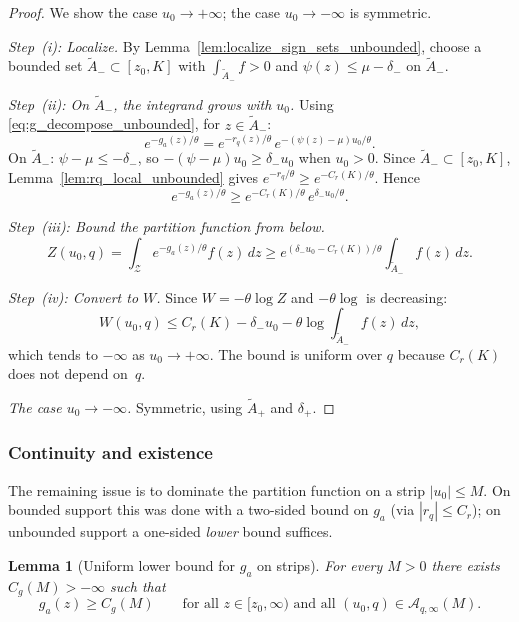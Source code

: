 \documentclass[12pt,a4paper]{article}
\theoremstyle{definition}
\theoremstyle{plain}
\newtheorem{lemma}{Lemma}[section]
\theoremstyle{remark}
\newcommand{\zlow}{z_{\scriptscriptstyle 0}}
\newcommand{\calZ}{\mathcal{Z}}
\begin{document}
\begin{proof}
We show the case $u_0 \to +\infty$; the case
$u_0 \to -\infty$ is symmetric.

\emph{Step~(i): Localize.}
By Lemma~\ref{lem:localize_sign_sets_unbounded}, choose a
bounded set $\widetilde A_- \subset [\zlow,K]$ with
$\int_{\widetilde A_-} f > 0$ and
$\psi(z) \leq \mu - \delta_-$ on $\widetilde A_-$.

\emph{Step~(ii): On $\widetilde A_-$, the integrand grows
with $u_0$.}
Using \eqref{eq:g_decompose_unbounded}, for
$z \in \widetilde A_-$:
\[
  e^{-g_a(z)/\theta}
  = e^{-r_q(z)/\theta}\,
    e^{-(\psi(z)-\mu)u_0/\theta}.
\]
On $\widetilde A_-$: $\psi - \mu \leq -\delta_-$, so
$-(\psi - \mu)u_0 \geq \delta_- u_0$ when $u_0 > 0$.
Since $\widetilde A_- \subset [\zlow,K]$,
Lemma~\ref{lem:rq_local_unbounded} gives
$e^{-r_q/\theta} \geq e^{-C_r(K)/\theta}$.  Hence
\[
  e^{-g_a(z)/\theta}
  \geq e^{-C_r(K)/\theta}\,e^{\delta_- u_0/\theta}.
\]

\emph{Step~(iii): Bound the partition function from below.}
\[
  Z(u_0,q)
  = \int_{\calZ} e^{-g_a(z)/\theta} f(z)\,dz
  \geq e^{(\delta_- u_0 - C_r(K))/\theta}
      \int_{\widetilde A_-} f(z)\,dz.
\]

\emph{Step~(iv): Convert to $W$.}
Since $W = -\theta\log Z$ and $-\theta\log$ is decreasing:
\[
  W(u_0,q)
  \leq C_r(K) - \delta_- u_0
  - \theta\log\!\int_{\widetilde A_-} f(z)\,dz,
\]
which tends to $-\infty$ as $u_0 \to +\infty$.  The bound
is uniform over $q$ because $C_r(K)$ does not depend
on~$q$.

\emph{The case $u_0 \to -\infty$.}
Symmetric, using $\widetilde A_+$ and $\delta_+$.
\end{proof}


\subsubsection{Continuity and existence}

The remaining issue is to dominate the partition function on a strip
$|u_0| \leq M$.  On bounded support this was done with a two-sided
bound on $g_a$ (via $|r_q| \leq C_r$); on unbounded support a
one-sided \emph{lower} bound suffices.

\begin{lemma}[Uniform lower bound for $g_a$ on strips]
\label{lem:ga_lower_unbounded}
For every $M > 0$ there exists $C_g(M) > -\infty$ such that
\[
  g_a(z) \geq C_g(M)
  \qquad \text{for all } z \in [\zlow,\infty)
  \text{ and all } (u_0,q) \in \mathcal{A}_{q,\infty}(M).
\]
\end{lemma}
\end{document}
